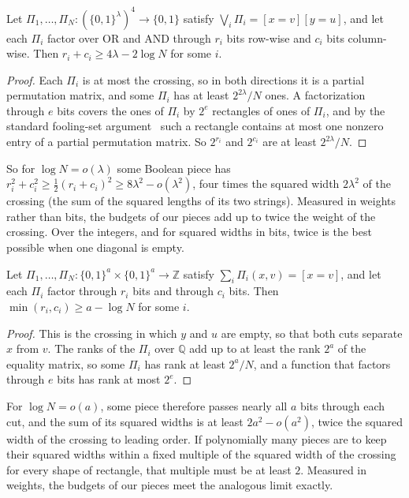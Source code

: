\documentclass[11pt]{article}
\theoremstyle{definition}
\theoremstyle{definition}
\theoremstyle{remark}
\newcommand{\Z}{\mathbb{Z}}
\begin{document}
\begin{proposition}\label{prop:boolean}
Let $\Pi_1,\dots,\Pi_N\colon(\{0,1\}^\lambda)^4\to\{0,1\}$ satisfy $\bigvee_i\Pi_i=[x=v][y=u]$, and let each $\Pi_i$ factor over OR and AND through $r_i$ bits row-wise and $c_i$ bits column-wise. Then $r_i+c_i\ge4\lambda-2\log N$ for some $i$.
\end{proposition}

\begin{proof}
Each $\Pi_i$ is at most the crossing, so in both directions it is a partial permutation matrix, and some $\Pi_i$ has at least $2^{2\lambda}/N$ ones. A factorization through $e$ bits covers the ones of $\Pi_i$ by $2^e$ rectangles of ones of $\Pi_i$, and by the standard fooling-set argument~\cite{KN97} such a rectangle contains at most one nonzero entry of a partial permutation matrix. So $2^{r_i}$ and $2^{c_i}$ are at least $2^{2\lambda}/N$.
\end{proof}

So for $\log N=o(\lambda)$ some Boolean piece has $r_i^2+c_i^2\ge\frac12(r_i+c_i)^2\ge8\lambda^2-o(\lambda^2)$, four times the squared width $2\lambda^2$ of the crossing (the sum of the squared lengths of its two strings). Measured in weights rather than bits, the budgets of our pieces add up to twice the weight of the crossing. Over the integers, and for squared widths in bits, twice is the best possible when one diagonal is empty.

\begin{proposition}\label{prop:barrier}
Let $\Pi_1,\dots,\Pi_N\colon\{0,1\}^a\times\{0,1\}^a\to\Z$ satisfy $\sum_i\Pi_i(x,v)=[x=v]$, and let each $\Pi_i$ factor through $r_i$ bits and through $c_i$ bits. Then $\min(r_i,c_i)\ge a-\log N$ for some $i$.
\end{proposition}

\begin{proof}
This is the crossing in which $y$ and $u$ are empty, so that both cuts separate $x$ from $v$. The ranks of the $\Pi_i$ over $\mathbb Q$ add up to at least the rank $2^a$ of the equality matrix, so some $\Pi_i$ has rank at least $2^a/N$, and a function that factors through $e$ bits has rank at most $2^e$.
\end{proof}

For $\log N=o(a)$, some piece therefore passes nearly all $a$ bits through each cut, and the sum of its squared widths is at least $2a^2-o(a^2)$, twice the squared width of the crossing to leading order. If polynomially many pieces are to keep their squared widths within a fixed multiple of the squared width of the crossing for every shape of rectangle, that multiple must be at least $2$. Measured in weights, the budgets of our pieces meet the analogous limit exactly.
\end{document}
